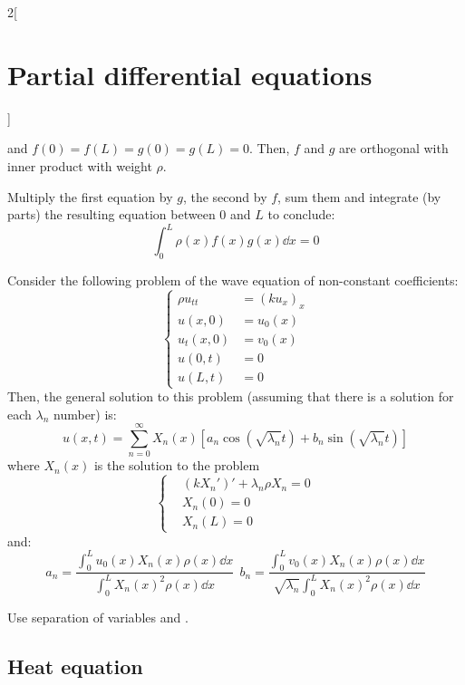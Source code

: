 \documentclass[../../../main_math.tex]{subfiles}
\begin{document}
\begin{multicols}{2}[\section{Partial differential equations}]
\begin{proposition}
    and $f(0)=f(L)=g(0)=g(L)=0$. Then, $f$ and $g$ are orthogonal with inner product with weight $\rho$.
  \end{proposition}
  \begin{sproof}
    Multiply the first equation by $g$, the second by $f$, sum them and integrate (by parts) the resulting equation between 0 and $L$ to conclude:
    $$
      \int_0^L\rho(x) f(x)g(x)\dd{x}=0
    $$
  \end{sproof}
  \begin{proposition}
    Consider the following problem of the wave equation of non-constant coefficients:
    \begin{equation}
      \left\{
      \begin{aligned}
        \rho u_{tt} & ={(ku_x)}_x \\
        u(x,0)      & =u_0(x)     \\
        u_t(x,0)    & =v_0(x)     \\
        u(0,t)      & =0          \\
        u(L,t)      & =0
      \end{aligned}
      \right.
    \end{equation}
    Then, the general solution to this problem (assuming that there is a solution for each $\lambda_n$ number) is:
    $$u(x,t)=\sum_{n=0}^\infty X_n(x)\left[a_n\cos\left(\sqrt{\lambda_n}t\right)+ b_n\sin\left( \sqrt{\lambda_n}t\right)\right]$$ where $X_n(x)$ is the solution to the problem $$ \left\{
      \begin{aligned}
         & {(k{X_n}')}'+\lambda_n\rho X_n =0  \\
         & X_n(0)                          =0 \\
         & X_n(L)                          =0
      \end{aligned}
      \right.$$
    and:
    \begin{equation*}
      a_n =\frac{\displaystyle\int_{0}^Lu_0(x)X_n(x)\rho(x)\dd{x}}{\displaystyle\int_{0}^LX_n(x)^2\rho(x)\dd{x}}\ \
      b_n =\frac{\displaystyle\int_{0}^Lv_0(x)X_n(x)\rho(x)\dd{x}}{\displaystyle\sqrt{\lambda_n}\int_{0}^LX_n(x)^2\rho(x)\dd{x}}
    \end{equation*}
  \end{proposition}
  \begin{sproof}
    Use separation of variables and .
  \end{sproof}
  \subsection{Heat equation}

\end{multicols}
\end{document}
